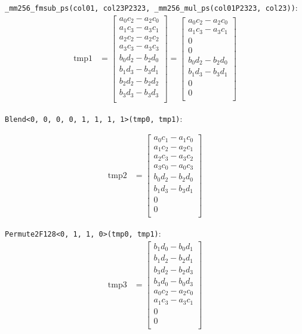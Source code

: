 \documentclass[]{scrartcl}
\begin{document}
\texttt{_mm256_fmsub_ps(col01, col23P2323, _mm256_mul_ps(col01P2323, col23))}:
\begin{align*}
\mathrm{tmp1} 
&=
\begin{bmatrix}
a_0c_2 - a_2c_0\\
a_1c_3 - a_3c_1\\
a_2c_2 - a_2c_2\\
a_3c_3 - a_3c_3\\
b_0d_2 - b_2d_0\\
b_1d_3 - b_3d_1\\
b_2d_2 - b_2d_2\\
b_3d_3 - b_3d_3\\
\end{bmatrix}
=
\begin{bmatrix}
a_0c_2 - a_2c_0\\
a_1c_3 - a_3c_1\\
0\\
0\\
b_0d_2 - b_2d_0\\
b_1d_3 - b_3d_1\\
0\\
0\\
\end{bmatrix}
\end{align*}


\texttt{Blend<0, 0, 0, 0, 1, 1, 1, 1>(tmp0, tmp1)}:

\begin{align*}
\mathrm{tmp2} 
&=
\begin{bmatrix}
a_0c_1 - a_1c_0\\
a_1c_2 - a_2c_1\\
a_2c_3 - a_3c_2\\
a_3c_0 - a_0c_3\\
b_0d_2 - b_2d_0\\
b_1d_3 - b_3d_1\\
0\\
0\\
\end{bmatrix}
\end{align*}

\texttt{Permute2F128<0, 1, 1, 0>(tmp0, tmp1)}:
\begin{align*}
\mathrm{tmp3} 
&=
\begin{bmatrix}
b_1d_0 - b_0d_1\\
b_1d_2 - b_2d_1\\
b_3d_2 - b_2d_3\\
b_3d_0 - b_0d_3\\
a_0c_2 - a_2c_0\\
a_1c_3 - a_3c_1\\
0\\
0\\
\end{bmatrix}
\end{align*}
\end{document}
